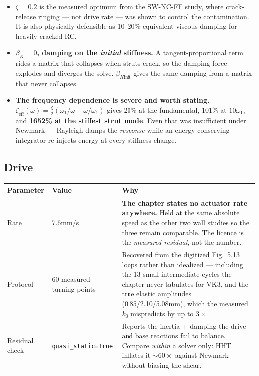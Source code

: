\documentclass[11pt,a4paper]{article}
\begin{document}
\begin{itemize}\itemsep2pt
\item \textbf{$\zeta=0.2$} is the measured optimum from the SW-NC-FF study, where crack-release
ringing --- not drive rate --- was shown to control the contamination. It is also physically
defensible as 10--20\% equivalent viscous damping for heavily cracked RC.
\item \textbf{$\beta_K=0$, damping on the \emph{initial} stiffness.} A tangent-proportional term
rides a matrix that collapses when struts crack, so the damping force explodes and diverges the
solve. $\beta_{K\text{init}}$ gives the same damping from a matrix that never collapses.
\item \textbf{The frequency dependence is severe and worth stating.}
$\zeta_{\text{eff}}(\omega)=\tfrac{\zeta}{2}(\omega_1/\omega+\omega/\omega_1)$ gives 20\% at the
fundamental, 101\% at $10\omega_1$, and \textbf{1652\% at the stiffest strut mode}. Even that was
insufficient under Newmark --- Rayleigh damps the \emph{response} while an energy-conserving
integrator re-injects energy at every stiffness change.
\end{itemize}

\subsection{Drive}

\begin{tabularx}{\textwidth}{@{}p{40mm}p{34mm}>{\raggedright\arraybackslash}X@{}}
\toprule
\textbf{Parameter} & \textbf{Value} & \textbf{Why} \\
\midrule
Rate & 7.6\unit{mm/s} & \textbf{The chapter states no actuator rate anywhere.} Held at the same absolute speed as the other two wall studies so the three remain comparable. The licence is the \emph{measured residual}, not the number. \\
Protocol & 60 measured turning points & Recovered from the digitized Fig.~5.13 loops rather than idealized --- including the 13 small intermediate cycles the chapter never tabulates for VK3, and the true elastic amplitudes (0.85/2.10/5.08\unit{mm}), which the measured $k_0$ mispredicts by up to $3\times$. \\
Residual check & \texttt{quasi\_static=True} & Reports the inertia $+$ damping the drive and base reactions fail to balance. Compare \emph{within} a solver only: HHT inflates it $\sim60\times$ against Newmark without biasing the shear. \\
\bottomrule
\end{tabularx}
\end{document}
